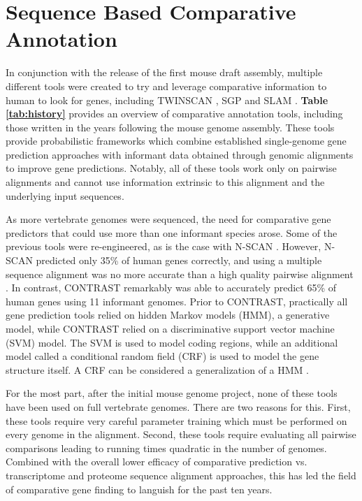 \documentclass[fleqn,10pt]{wlscirep}
\begin{document}
\section{Sequence Based Comparative Annotation}

In conjunction with the release of the first mouse draft assembly\cite{waterston2002initial}, multiple different tools were created to try and leverage comparative information to human to look for genes, including TWINSCAN \cite{flicek2003leveraging}, SGP \cite{wiehe2001sgp} and SLAM \cite{alexandersson2003slam}. \textbf{Table \ref{tab:history}} provides an overview of comparative annotation tools, including those written in the years following the mouse genome assembly. These tools provide probabilistic frameworks which combine established single-genome gene prediction approaches \cite{yeh2001computational,gelfand1996gene} with informant data obtained through genomic alignments to improve gene predictions. Notably, all of these tools work only on pairwise alignments and cannot use information extrinsic to this alignment and the underlying input sequences.

As more vertebrate genomes were sequenced, the need for comparative gene predictors that could use more than one informant species arose. Some of the previous tools were re-engineered, as is the case with N-SCAN \cite{gross2006using,van2007using}. However, N-SCAN predicted only 35\% of human genes correctly, and using a multiple sequence alignment was no more accurate than a high quality pairwise alignment \cite{flicek2007gene}. In contrast, CONTRAST \cite{gross2007contrast} remarkably was able to accurately predict 65\% of human genes using 11 informant genomes. Prior to CONTRAST, practically all gene prediction tools relied on hidden Markov models (HMM), a generative model, while CONTRAST relied on a discriminative support vector machine (SVM) model. The SVM is used to model coding regions, while an additional model called a conditional random field (CRF) is used to model the gene structure itself. A CRF can be considered a generalization of a HMM \cite{lafferty2001conditional}.

For the most part, after the initial mouse genome project, none of these tools have been used on full vertebrate genomes. There are two reasons for this. First, these tools require very careful parameter training which must be performed on every genome in the alignment. Second, these tools require evaluating all pairwise comparisons leading to running times quadratic in the number of genomes. Combined with the overall lower efficacy of comparative prediction vs. transcriptome and proteome sequence alignment approaches, this has led the field of comparative gene finding to languish for the past ten years.
\end{document}
